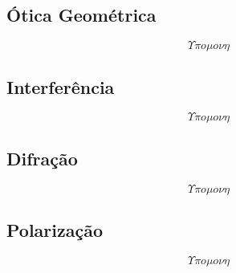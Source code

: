 \subsection{Ótica Geométrica}
    \[ \Upsilon \pi o \mu o \nu \eta \]
\subsection{Interferência}
    \[ \Upsilon \pi o \mu o \nu \eta \]
\subsection{Difração}
    \[ \Upsilon \pi o \mu o \nu \eta \]
\subsection{Polarização}
    \[ \Upsilon \pi o \mu o \nu \eta \]